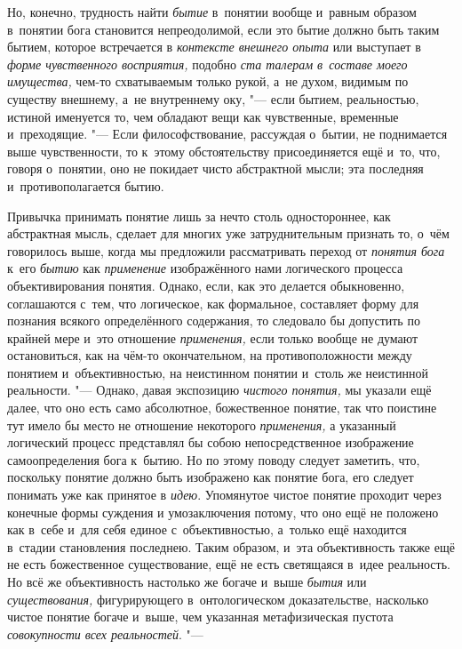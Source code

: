 Но, конечно, трудность найти {\em бытие} в~понятии
вообще и~равным образом в~понятии бога становится непреодолимой, если это
бытие должно быть таким бытием, которое встречается в
{\em контексте внешнего опыта} или выступает в {\em форме
чувственного восприятия,} подобно {\em ста талерам в~составе моего
имущества,} чем-то схватываемым только рукой, а~не духом,
видимым по существу внешнему, а~не внутреннему оку, "--- если
бытием, реальностью, истиной именуется то, чем обладают вещи как
чувственные, временные и~преходящие. "--- Если
философствование, рассуждая о~бытии, не поднимается выше чувственности, то
к~этому обстоятельству присоединяется ещё и~то, что, говоря о~понятии, оно
не покидает чисто абстрактной мысли; эта последняя и~противополагается бытию.

Привычка принимать понятие лишь за нечто столь одностороннее,
как абстрактная мысль, сделает для многих уже затруднительным признать то,
о~чём говорилось выше, когда мы предложили рассматривать переход от
{\em понятия бога} к~его {\em бытию} как {\em применение}
изображённого нами логического процесса объективирования
понятия. Однако, если, как это делается обыкновенно, соглашаются с~тем, что
логическое, как формальное, составляет форму для познания всякого
определённого содержания, то следовало бы допустить по крайней мере и~это
отношение {\em применения,}
если только вообще не думают остановиться, как на чём-то
окончательном, на противоположности между понятием и~объективностью, на
неистинном понятии и~столь же неистинной реальности. "---
Однако, давая экспозицию {\em чистого понятия,} мы
указали ещё далее, что оно есть само абсолютное, божественное понятие, так
что поистине тут имело бы место не отношение некоторого {\em применения,} а
указанный логический процесс представлял бы собою непосредственное
изображение самоопределения бога к~бытию. Но по этому поводу следует
заметить, что, поскольку понятие должно быть изображено как понятие бога,
его следует понимать уже как принятое в {\em идею}. Упомянутое
чистое понятие проходит через конечные формы суждения и
умозаключения потому, что оно ещё не положено как в~себе и~для себя единое
с~объективностью, а~только ещё находится в~стадии становления последнею.
Таким образом, и~эта объективность также ещё не есть божественное
существование, ещё не есть светящаяся в~идее реальность. Но всё же
объективность настолько же богаче и~выше {\em бытия} или {\em существования,}
фигурирующего в~онтологическом доказательстве, насколько
чистое понятие богаче и~выше, чем указанная метафизическая пустота
{\em совокупности всех реальностей}. "---

